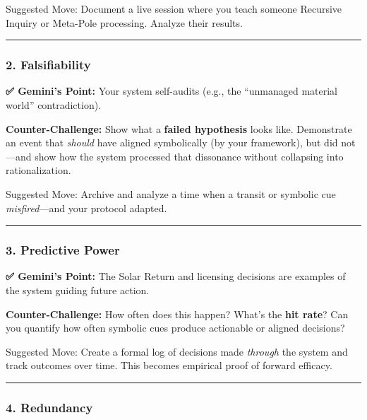 \documentclass{article}
\begin{document}
 Suggested Move: Document a live session where you teach someone
Recursive Inquiry or Meta-Pole processing. Analyze their results.

\begin{center}\rule{0.5\linewidth}{0.5pt}\end{center}

\subsubsection*{\texorpdfstring{\textbf{2.
Falsifiability}}{2. Falsifiability}}\label{falsifiability}

\textbf{✅ Gemini's Point:} Your system self-audits (e.g., the
``unmanaged material world'' contradiction).

\textbf{Counter-Challenge:} Show what a \textbf{failed hypothesis}
looks like. Demonstrate an event that \emph{should} have aligned
symbolically (by your framework), but did not---and show how the system
processed that dissonance without collapsing into rationalization.

 Suggested Move: Archive and analyze a time when a transit or symbolic
cue \emph{misfired}---and your protocol adapted.

\begin{center}\rule{0.5\linewidth}{0.5pt}\end{center}

\subsubsection*{\texorpdfstring{\textbf{3. Predictive
Power}}{3. Predictive Power}}\label{predictive-power}

\textbf{✅ Gemini's Point:} The Solar Return and licensing decisions are
examples of the system guiding future action.

\textbf{Counter-Challenge:} How often does this happen? What's the
\textbf{hit rate}? Can you quantify how often symbolic cues produce
actionable or aligned decisions?

 Suggested Move: Create a formal log of decisions made \emph{through}
the system and track outcomes over time. This becomes empirical proof of
forward efficacy.

\begin{center}\rule{0.5\linewidth}{0.5pt}\end{center}

\subsubsection*{\texorpdfstring{\textbf{4.
Redundancy}}{4. Redundancy}}\label{redundancy}
\end{document}
